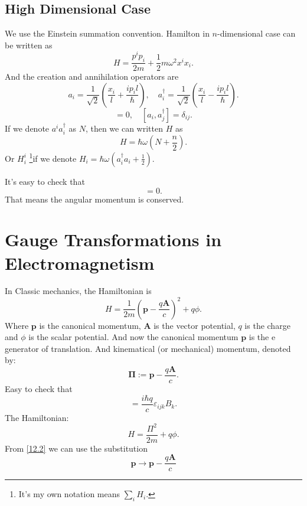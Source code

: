 \documentclass{article}
\theoremstyle{1}
\begin{document}
\subsection{High Dimensional Case}
We use the Einstein summation convention. Hamilton in $n$-dimensional case can be written as
\begin{equation}
    H=\frac{p^ip_i}{2m}+\frac{1}{2}m\omega^2x^ix_i.
\end{equation}
And the creation and annihilation operators are
\begin{equation}
    a_i=\frac{1}{\sqrt{2}}\left(\frac{x_i}{l}+\frac{ip_il}{\hbar}\right), \quad a^\dagger_i=\frac{1}{\sqrt{2}}\left(\frac{x_i}{l}-\frac{ip_il}{\hbar}\right).
\end{equation}
\begin{equation}
    [a_i,a_j]=0,\quad [a_i,a^\dagger_j]=\delta_{ij}.
\end{equation}
If we denote $a^ia_i^\dagger$ as $N$, then we can written $H$ as 
\begin{equation}
    H=\hbar \omega (N+\frac{n}{2}).
\end{equation}
Or $H^i_i$ \footnote{It's my own notation means $\displaystyle \sum_i H_i.$}if we denote $H_i=\hbar \omega (a_i^\dagger a_i+\frac{1}{2})$.

It's easy to check that 
\begin{equation}
    [a_i^\dagger a_j,H]=0.
\end{equation}
That means the angular momentum is conserved.


\section{Gauge Transformations in Electromagnetism}
\label{charged case}In Classic mechanics, the Hamiltonian is
\begin{equation}
    H=\frac{1}{2m}\left(\mathbf{p}-\frac{q\mathbf{A}}{c}\right)^2+q\phi.
\end{equation}
Where $\mathbf{p}$ is the canonical momentum, $\mathbf{A}$ is the vector potential, $q$ is the charge and $\phi$ is the scalar potential. And now the canonical momentum $\mathbf{p}$ is the e generator of translation. And kinematical (or mechanical) momentum, denoted by:
\begin{equation}\label{12.2}
    \mathbf{\Pi}:=\mathbf{p}-\frac{q\mathbf{A}}{c}.
\end{equation}
Easy to check that
\begin{equation}
    [\Pi_i,\Pi_j]=\frac{i\hbar q}{c}\varepsilon_{ijk}B_k.
\end{equation}
The Hamiltonian:
\begin{equation}
    H=\frac{\Pi^2}{2m}+q\phi.
\end{equation}
From \eqref{12.2} we can use the substitution 
\begin{equation}
    \mathbf{p}\longrightarrow \mathbf{p}-\frac{q\mathbf{A}}{c}
\end{equation}
\end{document}
